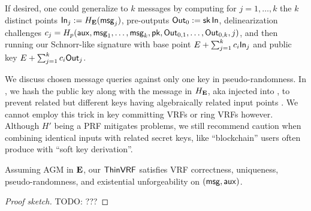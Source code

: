 If desired, one could generalize \ThinVRF to $k$ messages by
computing for $j=1,\ldots,k$ the $k$ distinct
points ${\mathsf{In}}_j := H_{{\mathbf{E}}}(\mathsf{msg}_j)$, pre-outputs ${\mathsf{Out}}_0 := \mathsf{sk} \, {\mathsf{In}}$,
delinearization challenges
 $c_j = H_p(\mathsf{aux},\mathsf{msg}_1,\ldots,\mathsf{msg}_k,\mathsf{pk},{\mathsf{Out}}_{0,1},\ldots,{\mathsf{Out}}_{0,k},j)$,
and then running our Schnorr-like signature with
 base point $E + \sum_{j=1}^k c_i {\mathsf{In}}_j$ and
 public key $E + \sum_{j=1}^k c_i {\mathsf{Out}}_j$.


%


We discuss chosen message queries against only one key in pseudo-randomness.  
In \ThinVRF, we hash the public key \pk along with the message \msg
in $H_{\mathbf{E}}$, aka injected \pk into \msg, to prevent
related but different keys having algebraically related input points \In.
We cannot employ this trick in key committing VRFs or ring VRFs however.
Although $H'$ being a PRF mitigates problems, we still recommend caution 
when combining identical inputs \msg with related secret keys,
 like ``blockchain'' users often produce with ``soft key derivation''.

\begin{proposition}\label{prop:thin_vrf}
Assuming AGM in ${\mathbf{E}}$, %
our $\ThinVRF$ satisfies
 VRF correctness, uniqueness, pseudo-randomness,
 and existential unforgeability on $(\msg,\aux)$.
\end{proposition}

\begin{proof}[Proof sketch]
TODO: ???
\end{proof}


\endinput




We expect $\ThinVRF$ to be an EUF-CMA signature scheme on $(\msg,\aux)$ too,
but proving this requires techniques outside our scope, even assuming AGM.

